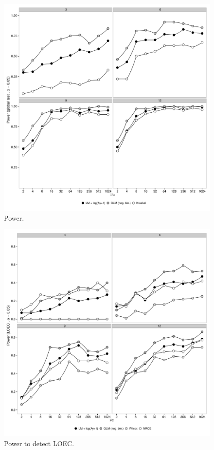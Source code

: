 \documentclass{scrartcl}\usepackage[]{graphicx}\usepackage[]{color}
\begin{document}
\begin{figure}
  \includegraphics[width = \textwidth]{p2.pdf}
  \caption{Power.}
  \label{fig:p2}
\end{figure}

\begin{figure}
  \includegraphics[width = \textwidth]{p3.pdf}
  \caption{Power to detect LOEC.}
  \label{fig:p3}
\end{figure}
\end{document}
